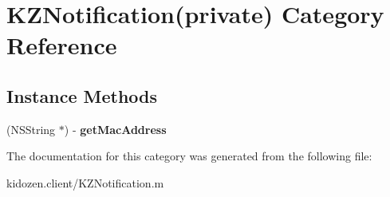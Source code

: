 \hypertarget{category_k_z_notification_07private_08}{\section{K\-Z\-Notification(private) Category Reference}
\label{category_k_z_notification_07private_08}
}
\subsection*{Instance Methods}
\begin{DoxyCompactItemize}
\item 
\hypertarget{category_k_z_notification_07private_08_a120b52e2ccd1991bfbb5ed37bd8d2aeb}{(N\-S\-String $\ast$) -\/ {\bfseries get\-Mac\-Address}}\label{category_k_z_notification_07private_08_a120b52e2ccd1991bfbb5ed37bd8d2aeb}

\end{DoxyCompactItemize}


The documentation for this category was generated from the following file\-:\begin{DoxyCompactItemize}
\item 
kidozen.\-client/K\-Z\-Notification.\-m\end{DoxyCompactItemize}
